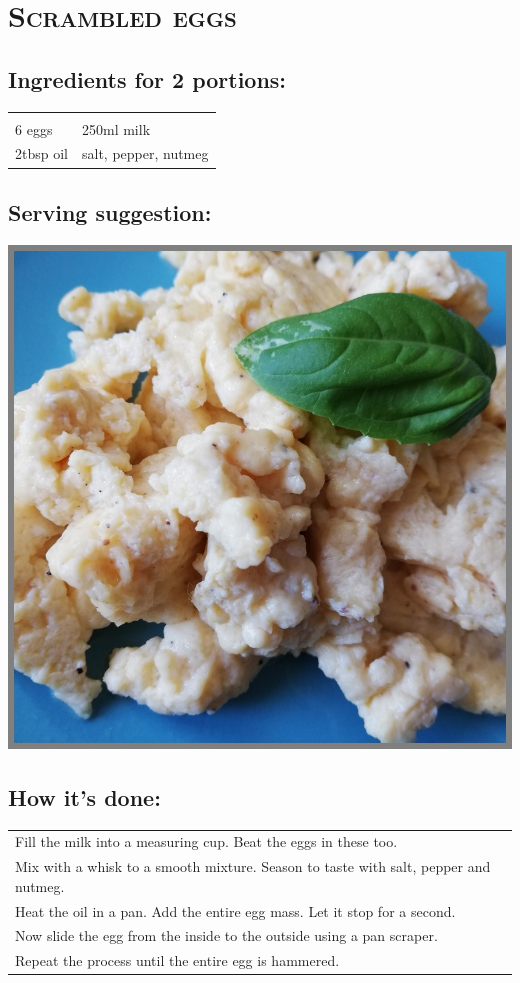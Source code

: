 \section{\textsc{Scrambled eggs}}

\subsection*{Ingredients for 2 portions:}

\begin{tabular}{p{7.5cm} p{7.5cm}}
	& \\
	6 eggs & 250ml milk \\
	2tbsp oil & salt, pepper, nutmeg
\end{tabular}

\subsection*{Serving suggestion:}

\includegraphics[width=\textwidth]{img/ruehrei.jpg} \cite{ruehrei}

\subsection*{How it's done:}

\begin{tabular}{p{15cm}}
	\\
  Fill the milk into a measuring cup. Beat the eggs in these too.\\
  Mix with a whisk to a smooth mixture. Season to taste with salt, pepper and nutmeg.\\
  Heat the oil in a pan. Add the entire egg mass. Let it stop for a second.\\
  Now slide the egg from the inside to the outside using a pan scraper.\\
  Repeat the process until the entire egg is hammered.
\end{tabular}
